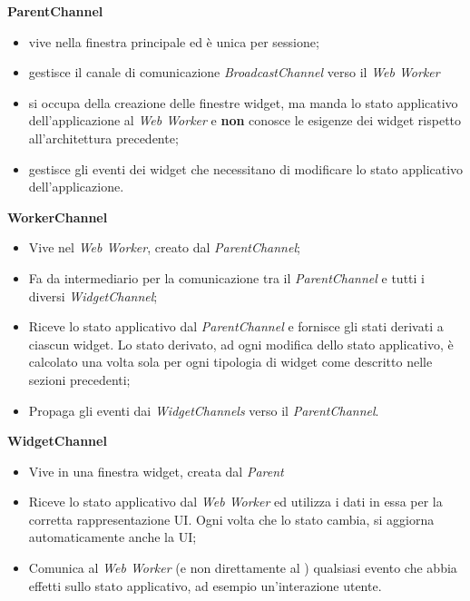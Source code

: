 \textbf{ParentChannel}
    \begin{itemize}
        \item vive nella finestra principale ed è unica per sessione;
        \item gestisce il canale di comunicazione \textit{BroadcastChannel} verso il \textit{Web Worker}
        \item si occupa della creazione delle finestre widget, ma manda lo stato applicativo dell'applicazione al \textit{Web Worker} e \textbf{non} conosce le esigenze dei widget rispetto all'architettura precedente;
        \item gestisce gli eventi dei widget che necessitano di modificare lo stato applicativo dell'applicazione.
    \end{itemize}
\textbf{WorkerChannel}
    \begin{itemize}
        \item Vive nel \textit{Web Worker}, creato dal \textit{ParentChannel};
        \item Fa da intermediario per la comunicazione tra il \textit{ParentChannel} e tutti i diversi \textit{WidgetChannel};
        \item Riceve lo stato applicativo dal \textit{ParentChannel} e fornisce gli stati derivati a ciascun widget. Lo stato derivato, ad ogni modifica dello stato applicativo, è calcolato una volta sola per ogni tipologia di widget come descritto nelle sezioni precedenti;
        \item Propaga gli eventi dai \textit{WidgetChannels} verso il \textit{ParentChannel}.
    \end{itemize}
\textbf{WidgetChannel}
    \begin{itemize}
        \item Vive in una finestra widget, creata dal \textit{Parent}
        \item Riceve lo stato applicativo dal \textit{Web Worker} ed utilizza i dati in essa per la corretta rappresentazione UI. Ogni volta che lo stato cambia, si aggiorna automaticamente anche la UI;
        \item Comunica al \textit{Web Worker} (e non direttamente al ) qualsiasi evento che abbia effetti sullo stato applicativo, ad esempio un'interazione utente.
    \end{itemize}
